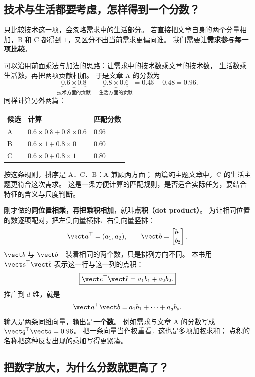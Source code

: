 \subsection{技术与生活都要考虑，怎样得到一个分数？}

只比较技术这一项，会忽略需求中的生活部分。
若直接把文章自身的两个分量相加，B 和 C 都得到 $1$，又区分不出当前需求更偏向谁。
我们需要让\textbf{需求参与每一项比较}。

可以沿用前面乘法与加法的思路：让需求中的技术数乘文章的技术数，
生活数乘生活数，再把两项贡献相加。
于是文章 A 的分数为
\[
\underbrace{0.6\times0.8}_{\text{技术方面的贡献}}
+\underbrace{0.8\times0.6}_{\text{生活方面的贡献}}
=0.48+0.48=0.96.
\]
同样计算另外两篇：
\begin{center}
\begin{tabular}{@{}lll@{}}\toprule
候选 & 计算 & 匹配分数\\\midrule
A & $0.6\times0.8+0.8\times0.6$ & $0.96$\\
B & $0.6\times1+0.8\times0$ & $0.60$\\
C & $0.6\times0+0.8\times1$ & $0.80$\\\bottomrule
\end{tabular}
\end{center}
按这条规则，排序是 A、C、B：A 兼顾两方面；
两篇纯主题文章中，C 的生活主题更符合这次需求。
这是一条方便计算的匹配规则，是否适合实际任务，要结合特征的含义与尺度判断。

\label{concept:dot-product}
刚才做的\textbf{同位置相乘，再把乘积相加}，就叫\textbf{点积（dot product）}。
为让相同位置的数逐项配对，把左侧向量横排、右侧向量竖排：
\[
\vect a^\top=(a_1,a_2),\qquad
\vect b=\begin{bmatrix}b_1\\b_2\end{bmatrix}.
\]
$\vect b$ 与 $\vect b^\top$ 装着相同的两个数，只是排列方向不同。
本书用 $\vect a^\top\vect b$ 表示这一行与这一列的点积：
\begin{equation}
\boxed{\vect a^\top\vect b=a_1b_1+a_2b_2.}
\end{equation}
推广到 $d$ 维，就是
\[
\vect a^\top\vect b=a_1b_1+\cdots+a_db_d.
\]
输入是两条同维向量，输出是\textbf{一个数}。
例如需求与文章 A 的分数写成 $\vect q^\top\vect a=0.96$。
把一条向量当作权重看，这也是多项加权求和；
点积的名称把这种反复出现的乘加写得更紧凑。

\subsection{把数字放大，为什么分数就更高了？}

